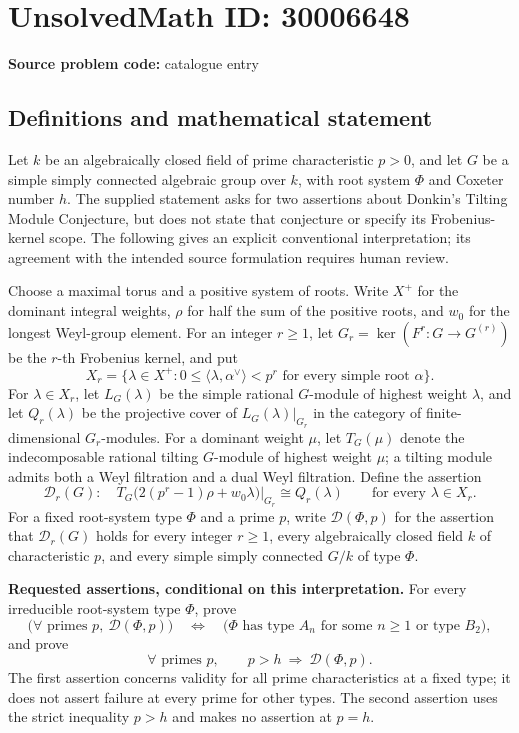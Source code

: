 \documentclass[11pt]{article}
\begin{document}
\section*{UnsolvedMath ID: 30006648}
\textbf{Source problem code:} catalogue entry
\subsection{Definitions and mathematical statement}
Let \(k\) be an algebraically closed field of prime characteristic \(p>0\), and let \(G\) be a simple simply connected algebraic group over \(k\), with root system \(\Phi\) and Coxeter number \(h\). The supplied statement asks for two assertions about Donkin's Tilting Module Conjecture, but does not state that conjecture or specify its Frobenius-kernel scope. The following gives an explicit conventional interpretation; its agreement with the intended source formulation requires human review.

Choose a maximal torus and a positive system of roots. Write \(X^+\) for the dominant integral weights, \(\rho\) for half the sum of the positive roots, and \(w_0\) for the longest Weyl-group element. For an integer \(r\geq 1\), let \(G_r=\ker(F^r:G\longrightarrow G^{(r)})\) be the \(r\)-th Frobenius kernel, and put
\[
X_r=\{\lambda\in X^+:0\leq\langle\lambda,\alpha^\vee\rangle<p^r\text{ for every simple root }\alpha\}.
\]
For \(\lambda\in X_r\), let \(L_G(\lambda)\) be the simple rational \(G\)-module of highest weight \(\lambda\), and let \(Q_r(\lambda)\) be the projective cover of \(L_G(\lambda)|_{G_r}\) in the category of finite-dimensional \(G_r\)-modules. For a dominant weight \(\mu\), let \(T_G(\mu)\) denote the indecomposable rational tilting \(G\)-module of highest weight \(\mu\); a tilting module admits both a Weyl filtration and a dual Weyl filtration. Define the assertion
\[
\mathcal D_r(G):\quad
T_G\bigl(2(p^r-1)\rho+w_0\lambda\bigr)|_{G_r}
\cong Q_r(\lambda)
\qquad\text{for every }\lambda\in X_r.
\]
For a fixed root-system type \(\Phi\) and a prime \(p\), write \(\mathcal D(\Phi,p)\) for the assertion that \(\mathcal D_r(G)\) holds for every integer \(r\geq1\), every algebraically closed field \(k\) of characteristic \(p\), and every simple simply connected \(G/k\) of type \(\Phi\).

\textbf{Requested assertions, conditional on this interpretation.} For every irreducible root-system type \(\Phi\), prove
\[
\bigl(\forall\text{ primes }p,\ \mathcal D(\Phi,p)\bigr)
\quad\Longleftrightarrow\quad
\bigl(\Phi\text{ has type }A_n\text{ for some }n\geq1\text{ or type }B_2\bigr),
\]
and prove
\[
\forall\text{ primes }p,\qquad p>h\ \Longrightarrow\ \mathcal D(\Phi,p).
\]
The first assertion concerns validity for all prime characteristics at a fixed type; it does not assert failure at every prime for other types. The second assertion uses the strict inequality \(p>h\) and makes no assertion at \(p=h\).
\end{document}

